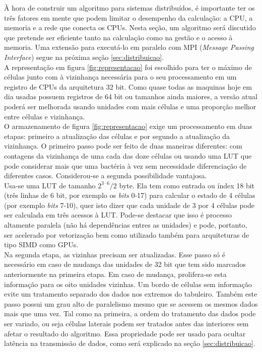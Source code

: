 \label{sec:algoritmo}

À hora de construir um algoritmo para sistemas distribuídos, é importante ter os três fatores em mente que podem limitar o desempenho da calculação: a CPU, a memoria e a rede que conecta os CPUs. Nesta seção, um algoritmo será discutido que pretende ser eficiente tanto na calculação como na gestão e o acesso à memoria. Uma extensão para executá-lo em paralelo com MPI (\textit{Message Passing Interface}) segue na próxima seção \ref{sec:distribuicao}.\\

A representação em figura \ref{fig:representacao} foi escolhido para ter o máximo de células junto com à vizinhança necessária para o seu processamento em um registro de CPUs da arquitetura 32 bit. Como quase todas as maquinas hoje em dia usadas possuem registros de 64 bit ou tamanhos ainda maiores, a versão atual poderá ser melhorada usando unidades com mais células e uma proporção melhor entre células e vizinhança.\\

O armazenamento de figura \ref{fig:representacao} exige um processamento em duas etapas: primeiro a atualização das células e por segundo a atualização da vizinhança. O primeiro passo pode ser feito de duas maneiras diferentes: com contagens da vizinhança de uma cada das doze células ou usando uma LUT que pode considerar mais que uma bactéria à vez sem necessidade diferenciação de diferentes casos. Considerou-se a segunda possibilidade vantajosa.\\

Usa-se uma LUT de tamanho $2^{3\cdot6}/2$ byte. Ela tem como entrada ou índex 18 bit (três linhas de 6 bit, por exemplo os \textit{bits} 0-17)  para calcular o estado de 4 células (por exemplo \textit{bits} 7-10), quer isto dizer que cada unidade de 3 por 4 células pode ser calculada em três acessos à LUT. Pode-se destacar que isso é processo altamente paralela (não há dependências entres as unidades) e pode, portanto, ser acelerado por vetorização bem como utilizado também para arquiteturas de tipo SIMD como GPUs.\\

Na segunda etapa, as vizinhas precisam ser atualizadas. Esse passo só é necessário em caso de mudança das unidades de 32 bit que tem sido marcados anteriormente na primeira etapa. Em caso de mudança, prolifera-se esta informação para os oito unidades vizinhas. Um bordo de células sem informação evite um tratamento separado dos dados nos extremos do tabuleiro. Também este passo possui um grau alto de paralelismo mesmo que se acessem os mesmos dados mais que uma vez. Tal como na primeira, a ordem do tratamento das dados pode ser variado, ou seja células laterais podem ser tratados antes das interiores sem afetar o resultado do algoritmo. Essa propriedade pode ser usado para ocultar latência na transmissão de dados, como será explicado na seção \ref{sec:distribuicao}.\\